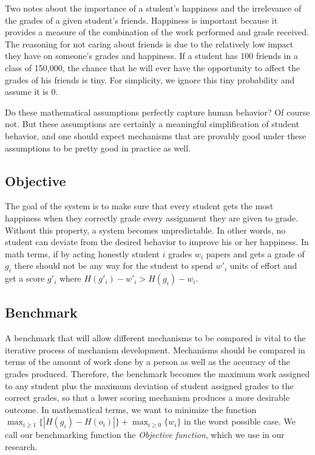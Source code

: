 \documentclass[12pt, Arial]{article}
\begin{document}
Two notes about the importance of a student's happiness and the irrelevance of the grades of a given student's friends. Happiness is important because it provides a measure of the combination of the work performed and grade received. The reasoning for not caring about friends is due to the relatively low impact they have on someone's grades and happiness. If a student has 100 friends in a class of 150,000, the chance that he will ever have the opportunity to affect the grades of his friends is tiny. For simplicity, we ignore this tiny probability and assume it is 0.

Do these mathematical assumptions perfectly capture human behavior? Of course not. But these assumptions are certainly a meaningful simplification of student behavior, and one should expect mechanisms that are provably good under these assumptions to be pretty good in practice as well.
\subsection{Objective}
The goal of the system is to make sure that every student gets the most happiness when they correctly grade every assignment they are given to grade. Without this property, a system becomes unpredictable. In other words, no student can deviate from the desired behavior to improve his or her happiness. In math terms, if by acting honestly student $i$ grades $w_i$ papers and gets a grade of $g_i$ there should not be any way for the student to spend $w'_i$ units of effort and get a score $g'_i$ where $H(g'_i)-w'_i > H(g_i)-w_i$.

\subsection{Benchmark}
A benchmark that will allow different mechanisms to be compared is vital to the iterative process of mechanism development. Mechanisms should be compared in terms of the amount of work done by a person as well as the accuracy of the grades produced. Therefore, the benchmark becomes the maximum work assigned to any student plus the maximum deviation of student assigned grades to the correct grades, so that a lower scoring mechanism produces a more desirable outcome. In mathematical terms, we want to minimize the function $\max_{i \ge 1} \{|H(g_i)-H(o_i)|\} + \max_{i \ge 0} \{w_i\}$ in the worst possible case. We call our benchmarking function the \emph{Objective function}, which we use in our research.
\end{document}
